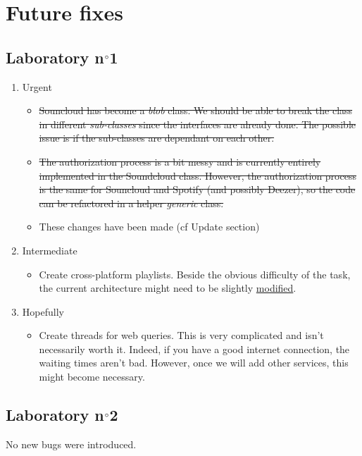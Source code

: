 \documentclass{report}
\begin{document}
\chapter{Future fixes}

\section{Laboratory n$\degree$1}
\begin{enumerate}
\item Urgent 
\begin{itemize}
\item \sout{Souncloud has become a \textit{blob} class. We should be able to break the class in different \textit{sub-classes} since the interfaces are already done. The possible issue is if the sub-classes are dependant on each other.}
\item \sout{The authorization process is a bit messy and is currently entirely implemented in the Soundcloud class. However, the authorization process is the same for Souncloud and Spotify (and possibly Deezer), so the code can be refactored in a helper \textit{generic} class.}
\item These changes have been made (cf Update section)
\end{itemize}
\item Intermediate
\begin{itemize}
\item Create cross-platform playlists. Beside the obvious difficulty of the task, the current architecture might need to be slightly \hyperlink{db}{modified}.
\end{itemize}
\item Hopefully
\begin{itemize}
\item Create threads for web queries. This is very complicated and isn't necessarily worth it. Indeed, if you have a good internet connection, the waiting times aren't bad. However, once we will add other services, this might become necessary.
\end{itemize}
\end{enumerate}

\section{Laboratory n$\degree$2}

No new bugs were introduced.
\end{document}
